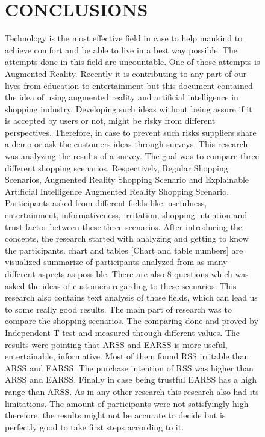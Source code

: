\documentclass[letterpaper, 10 pt, conference]{ieeeconf}
\begin{document}
\begin{figure}[h!]
\section{CONCLUSIONS}
Technology is the most effective field in case to help mankind to achieve comfort and be able to live in a best way possible. The attempts done in this field are uncountable. One of those attempts is Augmented Reality. Recently it is contributing to any part of our lives from education to entertainment but this document contained the idea of using augmented reality and artificial intelligence in shopping industry. Developing such ideas without being assure if it is accepted by users or not, might be risky from different perspectives. Therefore, in case to prevent such risks suppliers share a demo or ask the customers ideas through surveys. This research was analyzing the results of a survey. The goal was to compare three different shopping scenarios. Respectively, Regular Shopping Scenarios, Augmented Reality Shopping Scenario and Explainable Artificial Intelligence Augmented Reality Shopping Scenario. Participants asked from different fields like, usefulness, entertainment, informativeness, irritation, shopping intention and trust factor between these three scenarios. After introducing the concepts, the research started with analyzing and getting to know the participants. chart and tables [Chart and table numbers] are visualized summarize of participants analyzed from as many different aspects as possible. There are also 8 questions which was asked the ideas of customers regarding to these scenarios. This research also contains text analysis of those fields, which can lead us to some really good results. The main part of research was to compare the shopping scenarios. The comparing done and proved by Independent T-test and measured through different values. The results were pointing that ARSS and EARSS is more useful, entertainable, informative. Most of them found RSS irritable than ARSS and EARSS. The purchase intention of RSS was higher than ARSS and EARSS. Finally in case being trustful EARSS has a high range than ARSS. As in any other research this research also had its limitations. The amount of participants were not satisfyingly high therefore, the results might not be accurate to decide but is perfectly good to take first steps according to it. 

\begin{thebibliography}{99}



\end{thebibliography}
\end{figure}
\end{document}
